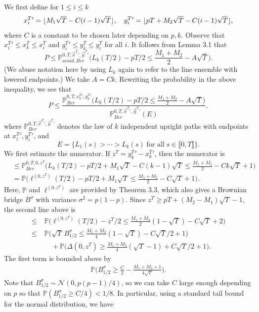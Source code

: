 \documentclass[12pt]{article}
\DeclarePairedDelimiter\floor{\lfloor}{\rfloor}
\begin{document}
	We first define for $1\leq i\leq k$
	\[
	x_i^T{}' = \floor{M_1\sqrt{T} - C(i-1)\sqrt{T}} , \quad y_i^T{}' = \floor{pT + M_2\sqrt{T} - C(i-1)\sqrt{T}} ,
	\]
	where $C$ is a constant to be chosen later depending on $p,k$. Observe that $x_i^T{}' \leq x_k^T \leq x_i^T$ and $y_i^T{}' \leq y_k^T \leq y_i^T$ for all $i$. It follows from Lemma 3.1 that
	\[
	P \leq \mathbb{P}^{0,T,\vec{x}^T{}',\vec{y}^T{}'}_{avoid, Ber} \Big( L_k(T/2) - pT/2 \leq \frac{M_1+M_2}{2} - A\sqrt{T} \Big).
	\]
	(We abuse notation here by using $L_k$ again to refer to the line ensemble with lowered endpoints.) We take $A = Ck$. Rewriting the probability in the above inequality, we see that
	\[
	P \leq \frac{\mathbb{P}^{0,T,x_k^T{}',y_k^T{}'}_{Ber} \Big( L_k(T/2) - pT/2 \leq \frac{M_1+M_2}{2} - A\sqrt{T} \Big)}{\mathbb{P}^{0,T,\vec{x}^T{}',\vec{y}^T{}'}_{Ber}(E)},
	\]
	where $\mathbb{P}^{0,T,\vec{x}^T{}',\vec{y}^T{}'}_{Ber}$ denotes the law of $k$ independent upright paths with endpoints at $x_i^T{}', y_i^T{}'$, and
	\[
	E = \{L_1(s) > \cdots > L_k(s)\;\textrm{for all}\;s \in \llbracket 0, T\rrbracket \}.
	\]
	We first estimate the numerator. If $z^T = y_k^T{}' - x_k^T{}'$, then the numerator is
	\begin{align*}
	& \leq \mathbb{P}^{0,T,0,z^T}_{Ber} \Big( L_k(T/2) - pT/2 + M_1\sqrt{T} - C(k-1)\sqrt{T} \leq \frac{M_1+M_2}{2} - Ck\sqrt{T} + 1\Big) \\
	& = \mathbb{P} \Big( \ell^{(0,z^T)}(T/2) - pT/2 + M_1\sqrt{T} \leq \frac{M_1+M_2}{2} - C\sqrt{T} + 1\Big).
	\end{align*}
	Here, $\mathbb{P}$ and $\ell^{(0,z^T)}$ are provided by Theorem 3.3, which also gives a Brownian bridge $B^{\sigma}$ with variance $\sigma^2 = p(1-p)$. Since $z^T \geq pT + (M_2 - M_1)\sqrt{T} - 1$, the second line above is
	\begin{align*}
	\leq \; & \mathbb{P} \Big( \ell^{(0,z^T)}(T/2) - z^T/2 \leq \frac{M_1+M_2}{2}(1-\sqrt{T}) - C\sqrt{T} + 2\Big)\\
	\leq \; & \mathbb{P} \Big( \sqrt{T}\,B^{\sigma}_{1/2} \leq \frac{M_1+M_2}{4}(1-\sqrt{T}) - C\sqrt{T}/2 + 1\Big)\\
	&\quad + \mathbb{P}\Big(\Delta(0,z^T) \geq \frac{M_1+M_2}{4}(\sqrt{T}-1) + C\sqrt{T}/2 + 1\Big).
	\end{align*}
	The first term is bounded above by
	\begin{align*}
	\mathbb{P} \Big( B^{\sigma}_{1/2} \geq  \frac{C}{2} - \frac{M_1 + M_2 + 1}{4\sqrt{T}}\Big).
	\end{align*}
	Note that $B_{1/2}^{\sigma}\sim\mathcal{N}(0,p(p-1)/4)$, so we can take $C$ large enough depending on $p$ so that $\mathbb{P}(B_{1/2}^{\sigma} \geq C/4) < 1/8$. In particular, using a standard tail bound for the normal distribution, we have
\end{document}
